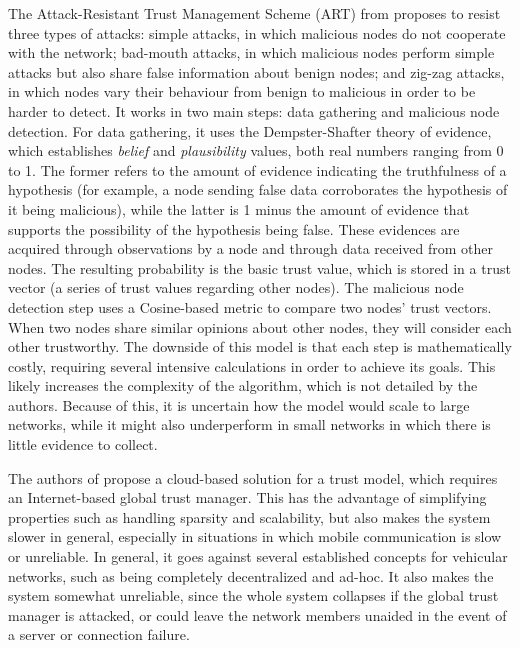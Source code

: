 The Attack-Resistant Trust Management Scheme (ART) from \citep{li2016art} proposes to resist three types of attacks: 
simple attacks, in which malicious nodes do not cooperate with the network;
bad-mouth attacks, in which malicious nodes perform simple attacks but also share false information about benign nodes;
and zig-zag attacks, in which nodes vary their behaviour from benign to malicious in order to be harder to detect.
It works in two main steps: data gathering and malicious node detection.
For data gathering, it uses the Dempster-Shafter theory of evidence, which establishes \textit{belief} and \textit{plausibility} values, both real numbers ranging from 0 to 1.
The former refers to the amount of evidence indicating the truthfulness of a hypothesis (for example, a node sending false data corroborates the hypothesis of it being malicious), while the latter is 1 minus the amount of evidence that supports the possibility of the hypothesis being false.
These evidences are acquired through observations by a node and through data received from other nodes.
The resulting probability is the basic trust value, which is stored in a trust vector (a series of trust values regarding other nodes).
The malicious node detection step uses a Cosine-based metric to compare two nodes' trust vectors.
When two nodes share similar opinions about other nodes, they will consider each other trustworthy.
The downside of this model is that each step is mathematically costly, requiring several intensive calculations in order to achieve its goals.
This likely increases the complexity of the algorithm, which is not detailed by the authors.
Because of this, it is uncertain how the model would scale to large networks, while it might also underperform in small networks in which there is little evidence to collect.

The authors of \citep{chen2017cloud} propose a cloud-based solution for a trust model, which requires an Internet-based global trust manager.
This has the advantage of simplifying properties such as handling sparsity and scalability, but also makes the system slower in general, especially in situations in which mobile communication is slow or unreliable.
In general, it goes against several established concepts for vehicular networks, such as being completely decentralized and ad-hoc.
It also makes the system somewhat unreliable, since the whole system collapses if the global trust manager is attacked, or could leave the network members unaided in the event of a server or connection failure.

